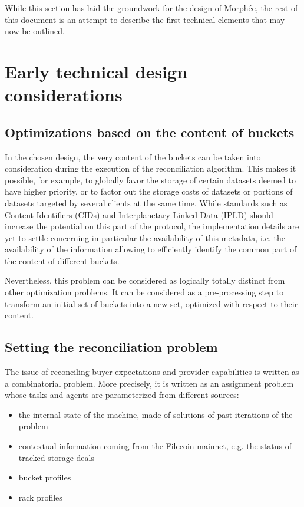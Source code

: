 \documentclass[twoside,twocolumn]{article}
\begin{document}
While this section has laid the groundwork for the design of Morphée,
the rest of this document is an attempt to describe the first technical elements that may now be outlined.


\section{Early technical design considerations}

\subsection{Optimizations based on the content of buckets}

In the chosen design, the very content of the buckets can be taken into consideration during the execution of the reconciliation algorithm.
This makes it possible, for example, to globally favor the storage of certain datasets deemed to have higher priority,
or to factor out the storage costs of datasets or portions of datasets targeted by several clients at the same time.
While standards such as Content Identifiers (CIDs) and Interplanetary Linked Data (IPLD) should increase the potential on this part of the protocol,
the implementation details are yet to settle concerning in particular the availability of this metadata,
i.e. the availability of the information allowing to efficiently identify the common part of the content of different buckets.

Nevertheless, this problem can be considered as logically totally distinct from other optimization problems.
It can be considered as a pre-processing step to transform an initial set of buckets into a new set, optimized with respect to their content.


\subsection{Setting the reconciliation problem}

The issue of reconciling buyer expectations and provider capabilities is written as a combinatorial problem.
More precisely, it is written as an assignment problem whose tasks and agents are parameterized from different sources:
\begin{itemize}
  \item the internal state of the machine, made of solutions of past iterations of the problem
  \item contextual information coming from the Filecoin mainnet, e.g. the status of tracked storage deals
  \item bucket profiles
  \item rack profiles
\end{itemize}
\end{document}
